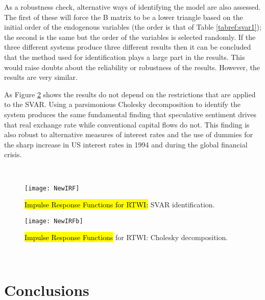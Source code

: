 \documentclass[jrfm,article,accept,moreauthors,pdftex]{Definitions/mdpi}
\begin{document}
As a robustness check, alternative ways of identifying the model are also assessed.  The first of these will force the B matrix to be a lower triangle based on the initial order of the endogenous variables (the order is that of Table \ref{tabref:svar1}); the second is the same but the order of the variables is selected randomly.  If the three different systems produce three different results then it can be concluded that the method used for identification plays a large part in the results.  This would raise doubts about the reliability or robustness of the results. However, the results are very similar.  

As Figure \ref{fig:IRF2} shows the results do not depend on the restrictions that are applied to the SVAR.  Using a parsimonious Cholesky decomposition to identify the system produces the same fundamental finding that speculative sentiment drives that real exchange rate while conventional capital flows do not.  This finding is also robust to alternative measures of interest rates and the use of dummies for the sharp increase in US interest rates in 1994 and during the global financial crisis. 

\startlandscape
\,\vspace{-12pt}

\begin{figure}[H]
\widefigure
\texttt{[image: NewIRF]}
\caption{\hl{Impulse Response Functions for RTWI:} %
 SVAR identification. }
\label{fig:IRF1}
\end{figure}
\unskip
\begin{figure}
\widefigure
\texttt{[image: NewIRFb]}
\caption{\hl{Impulse Response Functions} %
 for RTWI: Cholesky decomposition. }
\label{fig:IRF2}
\end{figure}
\finishlandscape

\,\vspace{-12pt}

\section{Conclusions}\label{sec5}
\end{document}
